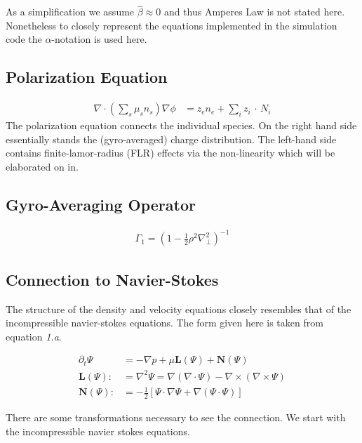 As a simplification we assume $\hat{\beta} \approx 0$ and thus Amperes Law is not stated here. Nonetheless to closely represent the equations implemented in the simulation code the $\alpha$-notation is used here.

\subsection{Polarization Equation}

\begin{align}
    \nabla \cdot \left( \sum_s \mu_s n_s \right) \nabla \phi &= z_e n_e + \sum_i z_i \, \cdot \, N_i \label{eq:polarization}
\end{align}
The polarization equation connects the individual species. On the right hand side essentially stands the (gyro-averaged) charge distribution.  The left-hand side contains finite-lamor-radius (FLR) effects via the non-linearity which will be elaborated on in.

\subsection{Gyro-Averaging Operator}
\begin{align}
    \Gamma_1 = \left(1- \frac{1}{2} \rho^2 \nabla_\perp^2\right)^{-1}
\end{align}


\subsection{Connection to Navier-Stokes}
\label{sec:connection_navier_stokes}

The structure of the density and velocity equations closely resembles that of the incompressible navier-stokes equations. The form given here is taken from \cite{KARNIADAKIS1991414} equation \textit{1.a}.

\begin{align}
    \partial_t \Psi &= -\nabla p + \mu \mathbf{L}(\Psi) + \mathbf{N}(\Psi)\\
    \mathbf{L}(\Psi):&= \nabla^2\Psi = \nabla(\nabla\cdot\Psi)-\nabla \times (\nabla \times \Psi)\\
    \mathbf{N}(\Psi):&= - \frac{1}{2}\left[\Psi \cdot \nabla \Psi + \nabla(\Psi \cdot \Psi)\right]
\end{align}

There are some transformations necessary to see the connection. We start with the incompressible navier stokes equations.

